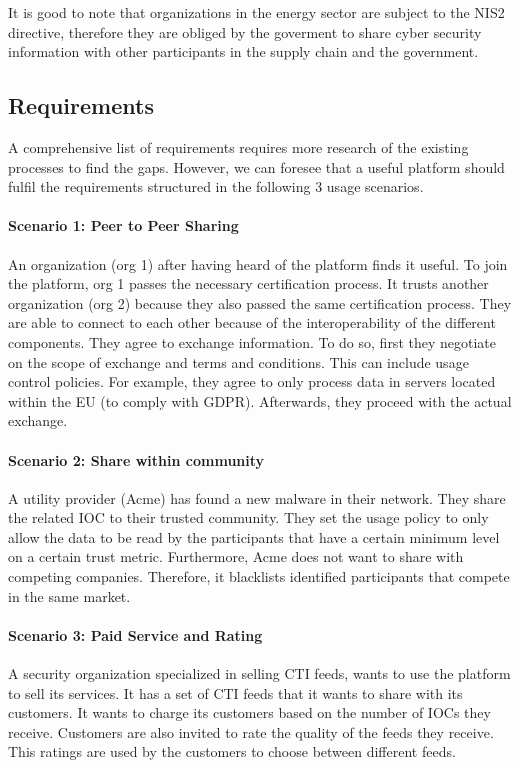 \documentclass{article}
\begin{document}
It is good to note that organizations in the energy sector are subject to the NIS2 directive, therefore they are obliged by the goverment to share cyber security information with other participants in the supply chain and the government.

\subsection{Requirements}
A comprehensive list of requirements requires more research of the existing processes to find the gaps. However, we can foresee that a useful platform should fulfil the requirements structured in the following 3 usage scenarios. 

\paragraph{Scenario 1: Peer to Peer Sharing}
An organization (org 1) after having heard of the platform finds it useful. To join the platform, org 1 passes the necessary certification process. It trusts another organization (org 2) because they also passed the same certification process. They are able to connect to each other because of the interoperability of the different components. They agree to exchange information. To do so, first they negotiate on the scope of exchange and terms and conditions. This can include usage control policies. For example, they agree to only process data in servers located within the EU (to comply with GDPR). Afterwards, they proceed with the actual exchange. 


\paragraph{Scenario 2: Share within community}
A utility provider (Acme) has found a new malware in their network. They share the related IOC to their trusted community. They set the usage policy to only allow the data to be read by the participants that have a certain minimum level on a certain trust metric. Furthermore, Acme does not want to share with competing companies. Therefore, it blacklists identified participants that compete in the same market.

\paragraph{Scenario 3: Paid Service and Rating}
A security organization specialized in selling CTI feeds, wants to use the platform to sell its services. It has a set of CTI feeds that it wants to share with its customers. It wants to charge its customers based on the number of IOCs they receive. Customers are also invited to rate the quality of the feeds they receive. This ratings are used by the customers to choose between different feeds.
\end{document}

